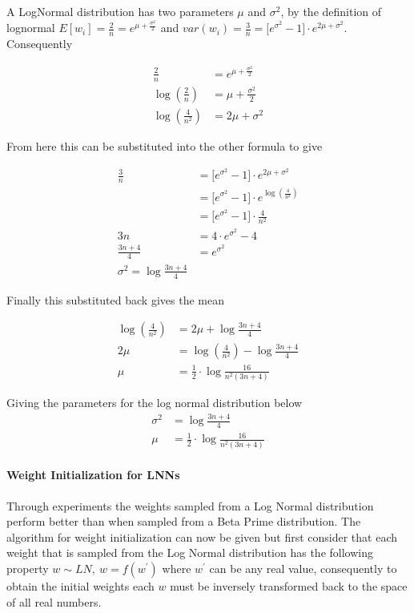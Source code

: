 A LogNormal distribution has two parameters $\mu$ and $\sigma^2$, by the definition of lognormal $E[w_i] = \frac{2}{n} = e^{\mu + \frac{\sigma^2}{2}}$ and $var(w_i) = \frac{3}{n} = \big[e^{\sigma^2} - 1\big] \cdot e^{2\mu + \sigma^2}$. Consequently

\begin{align*}
	\frac{2}{n} &= e^{\mu + \frac{\sigma^2}{2}}\\
	\log(\frac{2}{n}) &= \mu + \frac{\sigma^2}{2}\\
	\log(\frac{4}{n^2}) &= 2\mu + \sigma^2
\end{align*}

From here this can be substituted into the other formula to give

\begin{align*}
	\frac{3}{n} &= \big[e^{\sigma^2} - 1\big] \cdot e^{2\mu + \sigma^2}\\
	&= \big[e^{\sigma^2} - 1\big] \cdot e^{\log(\frac{4}{n^2})}\\
	&= \big[e^{\sigma^2} - 1\big] \cdot \frac{4}{n^2}\\
	3n &= 4 \cdot e^{\sigma^2} - 4\\
	\frac{3n + 4}{4} &= e^{\sigma^2}\\
	\sigma^2 = \log \frac{3n + 4}{4}
\end{align*}

Finally this substituted back gives the mean

\begin{align*}
	\log(\frac{4}{n^2}) &= 2\mu + \log \frac{3n + 4}{4}\\
	2\mu &= \log(\frac{4}{n^2}) - \log \frac{3n + 4}{4}\\
	\mu &= \frac{1}{2} \cdot \log \frac{16}{n^2(3n + 4)}
\end{align*}

Giving the parameters for the log normal distribution below
\begin{align}
	\sigma^2 &= \log \frac{3n + 4}{4}\\
	\mu &= \frac{1}{2} \cdot \log \frac{16}{n^2(3n + 4)}
\end{align}


\paragraph{Weight Initialization for LNNs}
Through experiments the weights sampled from a Log Normal distribution perform better than when sampled from a Beta Prime distribution. The algorithm for weight initialization can now be given but first consider that each weight that is sampled from the Log Normal distribution has the following property $w \sim LN,\ w = f(w^{'})$ where $w^{'}$ can be any real value, consequently to obtain the initial weights each $w$ must be inversely transformed back to the space of all real numbers.

